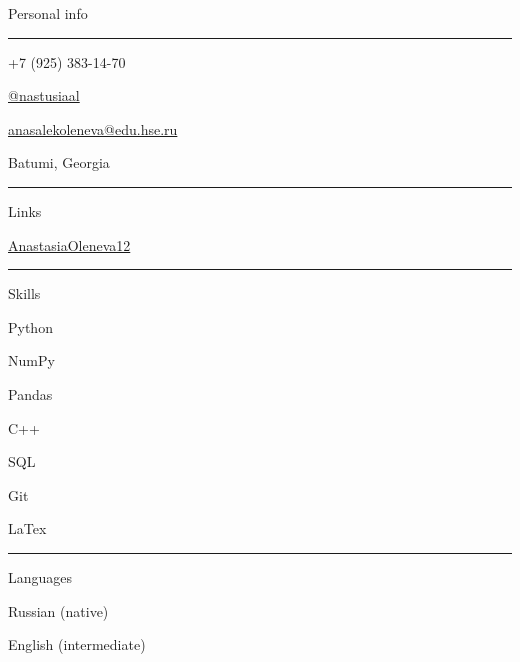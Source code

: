 \documentclass{letter}
\begin{document}
\begin{minipage}[t]{0.40\textwidth}
\setlength{\baselineskip}{1.3\baselineskip}
\color{white}
\vspace{0.5cm}
{\large Personal info}

\rule{\linewidth}{0.4pt}

\faPhone \quad +7 (925) 383-14-70

\faTelegram \quad \href{https://t.me/nastusiaal}{@nastusiaal}

\faEnvelope \quad \href{mailto:anasalekoleneva@edu.hse.ru}{anasalekoleneva@edu.hse.ru}


\faMapMarker \quad Batumi, Georgia

\rule{\linewidth}{0.4pt}

{\large Links}


\faGithub \quad \href{https://github.com/AnastasiaOleneva12}{AnastasiaOleneva12}

\rule{\linewidth}{0.4pt}

{\large Skills}

\faCircleNotch \quad Python

\faCircleNotch \quad NumPy 

\faCircleNotch \quad Pandas

\faCircleNotch \quad C++

\faCircleNotch \quad SQL

\faCircleNotch \quad Git

\faCircleNotch \quad LaTex


\rule{\linewidth}{0.4pt}

{\large Languages}

\faLanguage \quad Russian (native)

\faLanguage \quad English (intermediate)

\end{minipage}
\hfill
\end{document}
